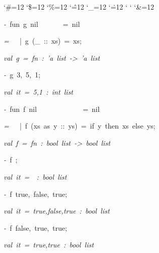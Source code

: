 \begin{list}{}
{\setlength{\leftmargin}{\leftmargini}
\setlength{\rightmargin}{0cm}
\setlength{\itemindent}{0cm}
\setlength{\listparindent}{0cm}
\setlength{\itemsep}{0cm}
\setlength{\parsep}{0cm}
\setlength{\labelsep}{0cm}
\setlength{\labelwidth}{0cm}
\catcode`\#=12
\catcode`\$=12
\catcode`\%=12
\catcode`\^=12
\catcode`\_=12
\catcode`\.=12
\catcode`
\catcode`
\catcode`\&=12
\ttfamily}
\small
\item[]\textsl{-\ }fun\ g\ nil\ \ \ \ \ \ \ =\ nil
\item[]\textsl{=\ }\ \ |\ g\ (_\ ::\ xs)\ =\ xs;
\item[]\textsl{val\ g\ =\ fn\ :\ 'a\ list\ ->\ 'a\ list}
\item[]\textsl{-\ }g\ 3,\ 5,\ 1;
\item[]\textsl{val\ it\ =\ 5,1\ :\ int\ list}
\item[]\textsl{-\ }fun\ f\ nil\ \ \ \ \ \ \ \ \ \ \ \ \ =\ nil
\item[]\textsl{=\ }\ \ |\ f\ (xs\ as\ y\ ::\ ys)\ =\ if\ y\ then\ xs\ else\ ys;
\item[]\textsl{val\ f\ =\ fn\ :\ bool\ list\ ->\ bool\ list}
\item[]\textsl{-\ }f\ ;
\item[]\textsl{val\ it\ =\ \ :\ bool\ list}
\item[]\textsl{-\ }f\ true,\ false,\ true;
\item[]\textsl{val\ it\ =\ true,false,true\ :\ bool\ list}
\item[]\textsl{-\ }f\ false,\ true,\ true;
\item[]\textsl{val\ it\ =\ true,true\ :\ bool\ list}
\end{list}
